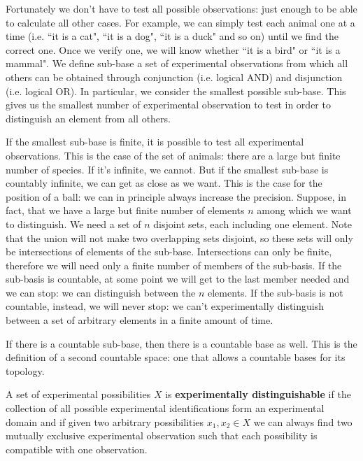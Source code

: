 \documentclass[11pt,letterpaper,fleqn]{memoir} %
\begin{document}
Fortunately we don't have to test all possible observations: just enough to be able to calculate all other cases. For example, we can simply test each animal one at a time (i.e. ``it is a cat", ``it is a dog", ``it is a duck" and so on) until we find the correct one. Once we verify one, we will know whether ``it is a bird" or ``it is a mammal". We define sub-base a set of experimental observations from which all others can be obtained through conjunction (i.e. logical AND) and disjunction (i.e. logical OR). In particular, we consider the smallest possible sub-base. This gives us the smallest number of experimental observation to test in order to distinguish an element from all others.

If the smallest sub-base is finite, it is possible to test all experimental observations. This is the case of the set of animals: there are a large but finite number of species. If it's infinite, we cannot. But if the smallest sub-base is countably infinite, we can get as close as we want. This is the case for the position of a ball: we can in principle always increase the precision. Suppose, in fact, that we have a large but finite number of elements $n$ among which we want to distinguish. We need a set of $n$ disjoint sets, each including one element. Note that the union will not make two overlapping sets disjoint, so these sets will only be intersections of elements of the sub-base. Intersections can only be finite, therefore we will need only a finite number of members of the sub-basis. If the sub-basis is countable, at some point we will get to the last member needed and we can stop: we can distinguish between the $n$ elements. If the sub-basis is not countable, instead, we will never stop: we can't experimentally distinguish between a set of arbitrary elements in a finite amount of time.

If there is a countable sub-base, then there is a countable base as well. This is the definition of a second countable space: one that allows a countable bases for its topology.

\begin{defn}
	A set of experimental possibilities $X$ is \textbf{experimentally distinguishable} if the collection of all possible experimental identifications form an experimental domain and if given two arbitrary possibilities $x_1, x_2 \in X$ we can always find two mutually exclusive experimental observation such that each possibility is compatible with one observation.
\end{defn}
\end{document}

